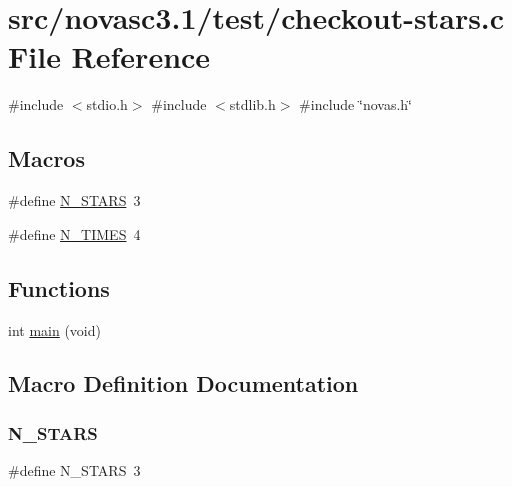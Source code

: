 \hypertarget{checkout-stars_8c}{}\section{src/novasc3.1/test/checkout-\/stars.c File Reference}
\label{checkout-stars_8c}
{\ttfamily \#include $<$stdio.\+h$>$}\newline
{\ttfamily \#include $<$stdlib.\+h$>$}\newline
{\ttfamily \#include \char`\"{}novas.\+h\char`\"{}}\newline
\subsection*{Macros}
\begin{DoxyCompactItemize}
\item 
\#define \mbox{\hyperlink{checkout-stars_8c_abe06342406a249e65b2c523ce1d903e1}{N\+\_\+\+S\+T\+A\+RS}}~3
\item 
\#define \mbox{\hyperlink{checkout-stars_8c_af0c96fa4c13709446e360bb80e2ddc45}{N\+\_\+\+T\+I\+M\+ES}}~4
\end{DoxyCompactItemize}
\subsection*{Functions}
\begin{DoxyCompactItemize}
\item 
int \mbox{\hyperlink{checkout-stars_8c_a840291bc02cba5474a4cb46a9b9566fe}{main}} (void)
\end{DoxyCompactItemize}


\subsection{Macro Definition Documentation}
\mbox{\label{checkout-stars_8c_abe06342406a249e65b2c523ce1d903e1}} 
\subsubsection{\texorpdfstring{N\+\_\+\+S\+T\+A\+RS}{N\_STARS}}
{\footnotesize\ttfamily \#define N\+\_\+\+S\+T\+A\+RS~3}

